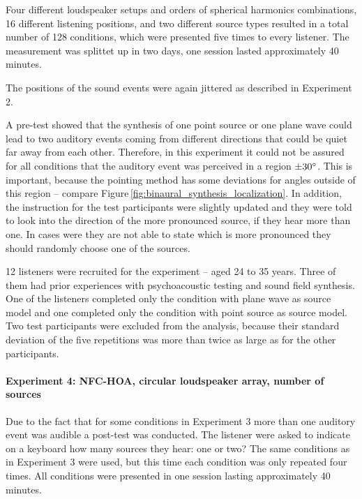 Four different loudspeaker setups and orders of spherical harmonics
combinations, 16 different listening positions, and two different source types
resulted in a total number of 128 conditions, which were presented five times to
every listener. The measurement was splittet up in two days, one session lasted
approximately 40 minutes.

The positions of the sound events were again jittered as described in Experiment
2.

A pre-test showed that the synthesis of one point source or one plane wave
could lead to two auditory events coming from different directions that could be
quiet far away from each other. Therefore, in this experiment it could not be
assured for all conditions that the auditory event was perceived in a region $\pm
30^\circ$. This is important, because the pointing method has some
deviations for angles outside of this region -- compare
Figure\,\ref{fig:binaural_synthesis_localization}.
In addition, the instruction for the test participants were slightly updated and
they were told to look into the direction of the more pronounced source,
if they hear more than one. In cases were they are not able to state which is
more pronounced they should randomly choose one of the sources.

12 listeners were recruited for the experiment -- aged 24 to 35 years.
Three of them had prior experiences with psychoacoustic testing and sound field
synthesis.
One of the listeners completed only the condition with plane wave as source
model and one completed only the condition with point source as source model.
Two test participants were excluded from the analysis, because their standard deviation
of the five repetitions was more than twice as large as for the other
participants.


\paragraph{Experiment 4: \ac{NFC-HOA}, circular loudspeaker array, number of
sources}
\label{sec:experiment4_nfchoa_circular_loudspeaker_array_number_of_sources}
%
Due to the fact that for some conditions in Experiment 3 more than one auditory
event was audible a post-test was conducted. The listener were asked to
indicate on a keyboard how many sources they hear: one or two?
The same conditions as in Experiment 3 were used, but this time each condition
was only repeated four times.
All conditions were presented in one session lasting approximately 40 minutes.

